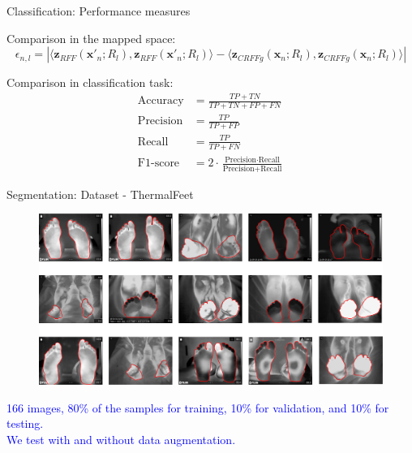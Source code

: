 \documentclass[aspectratio=169]{beamer}
\begin{document}
\begin{frame}{Classification: Performance measures}

Comparison in the mapped space:
\begin{equation*}
    \epsilon_{n,l} =|\langle \mathbf{z}_{\textit{RFF}}(\mathbf{x}'_n; R_l) ,  \mathbf{z}_{\textit{RFF}}(\mathbf{x}'_n; R_l) \rangle  - \langle \mathbf{z}_{\textit{CRFFg}}(\mathbf{x}_n; R_l) ,  \mathbf{z}_{\textit{CRFFg}}(\mathbf{x}_n; R_l) \rangle|
    \label{equ:diff}
\end{equation*}

\vspace{0.5cm}
Comparison in classification task:
\begin{align*}
\text{Accuracy} &= \frac{TP + TN}{TP + TN + FP + FN} \\
\text{Precision} &= \frac{TP}{TP + FP} \\
\text{Recall} &= \frac{TP}{TP + FN} \\
\text{F1-score} &= 2 \cdot \frac{\text{Precision} \cdot \text{Recall}}{\text{Precision} + \text{Recall}}
\end{align*}


\end{frame}


\begin{frame}{Segmentation: Dataset - ThermalFeet}
\begin{figure}
    \centering
    \includegraphics[width=0.75\linewidth]{Figures/thermalDataset.pdf}
\end{figure}
\begin{center}
    \textcolor{blue}{166 images, 80\% of the samples for training, 10\% for validation, and 10\% for testing.}\\ \textcolor{blue}{We test with and without data augmentation.}
\end{center}
\end{frame}
\end{document}
